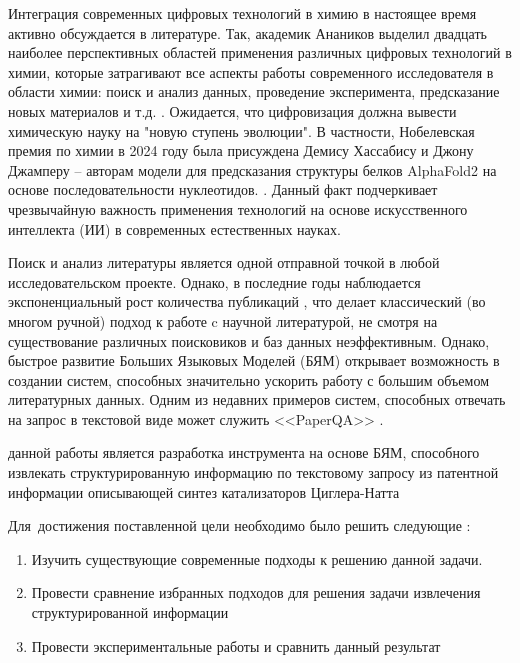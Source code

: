 {\actuality}

Интеграция современных цифровых технологий в химию в настоящее время активно обсуждается в литературе. Так, академик Анаников выделил двадцать наиболее перспективных областей применения различных цифровых технологий в химии, которые затрагивают все аспекты работы современного исследователя в области химии: поиск и анализ данных, проведение эксперимента, предсказание новых материалов и т.д. \autocite{ananikov_top_2024}. Ожидается, что цифровизация должна вывести химическую науку на "новую ступень эволюции". В частности, Нобелевская премия по химии в 2024 году была присуждена Демису Хассабису и Джону Джамперу -- авторам модели для предсказания структуры белков AlphaFold2 на основе последовательности нуклеотидов. \autocite{the_nobel_prize_in_сhemistry_2024}. Данный факт подчеркивает чрезвычайную важность применения технологий на основе искусственного интеллекта (ИИ) в современных естественных науках.

Поиск и анализ литературы является одной отправной точкой в любой исследовательском проекте. Однако, в последние годы наблюдается экспоненциальный рост количества публикаций \autocite{OverOptimizationAcademicPublishing2019}, что делает классический (во многом ручной) подход к работе c научной литературой, не смотря на существование различных поисковиков и баз данных неэффективным. Однако, быстрое развитие Больших Языковых Моделей (БЯМ) открывает возможность в создании систем, способных значительно ускорить работу с большим объемом литературных данных. Одним из недавних примеров систем, способных отвечать на запрос в текстовой виде может служить <<PaperQA>> \autocite{lalaPaperQARetrievalAugmentedGenerative2023}. 

{\aim} данной работы является разработка инструмента на основе БЯМ, способного извлекать структурированную информацию по текстовому запросу из патентной информации описывающей синтез катализаторов Циглера-Натта

Для~достижения поставленной цели необходимо было решить следующие {\tasks}:
\begin{enumerate}[beginpenalty=10000] %
	\item Изучить существующие современные подходы к решению данной задачи.
	\item Провести сравнение избранных подходов для решения задачи извлечения структурированной информации
	\item Провести экспериментальные работы и сравнить данный результат 
\end{enumerate}



